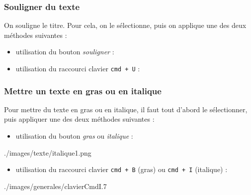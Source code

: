 \subsubsection{Souligner du texte}

On souligne le titre. Pour cela, on le sélectionne, puis on applique une des deux méthodes suivantes :

\begin{itemize}
\item utilisation du bouton \emph{souligner} :  
\item utilisation du raccourci clavier \texttt{cmd + U} : 
\end{itemize}




\subsubsection{Mettre un texte en gras ou en italique}

Pour mettre du texte en gras ou en italique, il faut tout d'abord le sélectionner, puis appliquer une des deux méthodes suivantes :

\begin{itemize}
\item utilisation du bouton \emph{gras} ou \emph{italique} :
\end{itemize}
%
              {./images/texte/italique1.png}{\textwidth}
\begin{itemize}
\item utilisation du raccourci clavier \texttt{cmd + B} (gras) ou \texttt{cmd + I} (italique) :
\end{itemize}
%
              {./images/generales/clavierCmdI}{.7\textwidth}


    









